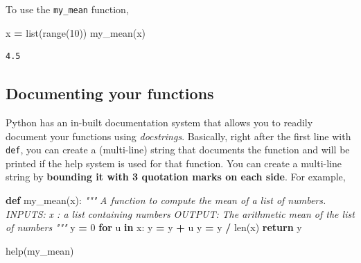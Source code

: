\documentclass[
  letterpaper,
]{scrbook}
\newenvironment{Shaded}{\begin{snugshade}}{\end{snugshade}}
\newcommand{\BuiltInTok}[1]{#1}
\newcommand{\CommentTok}[1]{\textcolor[rgb]{0.56,0.35,0.01}{\textit{#1}}}
\newcommand{\ControlFlowTok}[1]{\textcolor[rgb]{0.13,0.29,0.53}{\textbf{#1}}}
\newcommand{\DecValTok}[1]{\textcolor[rgb]{0.00,0.00,0.81}{#1}}
\newcommand{\KeywordTok}[1]{\textcolor[rgb]{0.13,0.29,0.53}{\textbf{#1}}}
\newcommand{\NormalTok}[1]{#1}
\newcommand{\OperatorTok}[1]{\textcolor[rgb]{0.81,0.36,0.00}{\textbf{#1}}}
\begin{document}
To use the \texttt{my\_mean} function,

\begin{Shaded}
\begin{Highlighting}[]
\NormalTok{x }\OperatorTok{=} \BuiltInTok{list}\NormalTok{(}\BuiltInTok{range}\NormalTok{(}\DecValTok{10}\NormalTok{))}
\NormalTok{my_mean(x)}
\end{Highlighting}
\end{Shaded}

\begin{verbatim}
4.5
\end{verbatim}

\hypertarget{documenting-your-functions}{%
\subsection{Documenting your functions}\label{documenting-your-functions}}

Python has an in-built documentation system that allows you to readily document your functions using \emph{docstrings}. Basically, right after the first line with \texttt{def}, you can create a (multi-line) string that documents the function and will be printed if the help system is used for that function. You can create a multi-line string by \textbf{bounding it with 3 quotation marks on each side}. For example,

\begin{Shaded}
\begin{Highlighting}[]
\KeywordTok{def}\NormalTok{ my_mean(x):}
    \CommentTok{"""}
\CommentTok{  A function to compute the mean of a list of numbers.}
\CommentTok{  }
\CommentTok{  INPUTS:}
\CommentTok{  x : a list containing numbers}
\CommentTok{  }
\CommentTok{  OUTPUT:}
\CommentTok{  The arithmetic mean of the list of numbers}
\CommentTok{  """}
\NormalTok{    y }\OperatorTok{=} \DecValTok{0}
    \ControlFlowTok{for}\NormalTok{ u }\KeywordTok{in}\NormalTok{ x:}
\NormalTok{        y }\OperatorTok{=}\NormalTok{ y }\OperatorTok{+}\NormalTok{ u}
\NormalTok{    y }\OperatorTok{=}\NormalTok{ y }\OperatorTok{/} \BuiltInTok{len}\NormalTok{(x)}
    \ControlFlowTok{return}\NormalTok{ y}
\end{Highlighting}
\end{Shaded}

\begin{Shaded}
\begin{Highlighting}[]
\BuiltInTok{help}\NormalTok{(my_mean)}
\end{Highlighting}
\end{Shaded}
\end{document}

